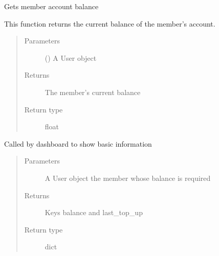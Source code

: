 \documentclass[letterpaper,10pt,english]{sphinxmanual}
\begin{document}

\begin{fulllineitems}
\label{\detokenize{payments:payments.core.get_balance}}
Gets member account balance

This function returns the current balance of the member’s account.
\begin{quote}\begin{description}
\item[{Parameters}] \leavevmode
{} ({\hyperref[\detokenize{accounts:accounts.models.User}]{}}) \textendash{} A User object

\item[{Returns}] \leavevmode
The member’s current balance

\item[{Return type}] \leavevmode
float

\end{description}\end{quote}

\end{fulllineitems}


\begin{fulllineitems}
\label{\detokenize{payments:payments.core.get_balance_detail}}
Called by dashboard to show basic information
\begin{quote}\begin{description}
\item[{Parameters}] \leavevmode
{} \textendash{} A User object \sphinxhyphen{} the member whose balance is required

\item[{Returns}] \leavevmode
Keys \sphinxhyphen{} balance and last\_top\_up

\item[{Return type}] \leavevmode
dict

\end{description}\end{quote}

\end{fulllineitems}
\end{document}
